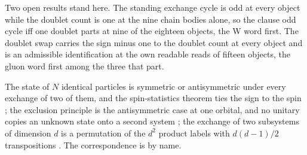 Two open results stand here. The standing exchange cycle is odd at every object while the doublet count is one at the nine chain bodies alone, so the clause odd cycle iff one doublet parts at nine of the eighteen objects, the W word first. The doublet swap carries the sign minus one to the doublet count at every object and is an admissible identification at the own readable reads of fifteen objects, the gluon word first among the three that part.
\begin{chbridge}
The state of $N$ identical particles is symmetric or antisymmetric under every exchange of two of them, and the spin-statistics theorem ties the sign to the spin \cite{Pauli1940}; the exclusion principle is the antisymmetric case at one orbital, and no unitary copies an unknown state onto a second system \cite{WoottersZurek1982}; the exchange of two subsystems of dimension $d$ is a permutation of the $d^2$ product labels with $d(d-1)/2$ transpositions \cite{Nielsen2000}. The correspondence is by name.
\end{chbridge}
